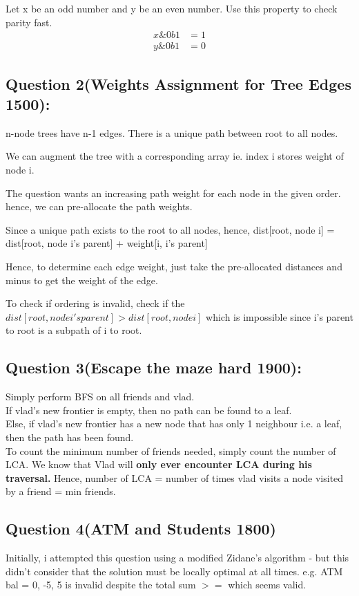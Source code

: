 \documentclass[12pt]{article}
\begin{document}
 
 Let x be an odd number and y be an even number.  Use this property to check parity fast. 
 \begin{align}
  x \& 0b1 & = 1 \\ 
  y \& 0b1 & = 0 
 \end{align} 
 
 \subsection{Question 2(Weights Assignment for Tree Edges 1500):} 
 
 n-node trees have n-1 edges. 
 There is a unique path between root to all nodes. 
 
 We can augment the tree with a corresponding array ie. index i stores weight of node i. 
 
 The question wants an increasing path weight for each node in the given order. 
 hence, we can pre-allocate the path weights. 
 
 Since a unique path exists to the root to all nodes, hence, 
 dist[root, node i] = dist[root, node i's parent] + weight[i, i's parent] 
 
 Hence, to determine each edge weight, just take the pre-allocated distances and minus to get the weight of the edge. 
 
 To check if ordering is invalid, check if the \(dist[root, node i's parent] > dist[root, node i]\) which is impossible since i's parent to root is a subpath of i to root. 
 
 \subsection{Question 3(Escape the maze hard 1900):}
 
 Simply perform BFS on all friends and vlad. \\
 If vlad's new frontier is empty, then no path can be found to a leaf. \\
 Else, if vlad's new frontier has a new node that has only 1 neighbour i.e. a leaf, then the path has been found. \\ 
 
 To count the minimum number of friends needed, simply count the number of LCA. 
 We know that Vlad will {\textbf{only ever encounter LCA during his traversal.}}
 Hence, number of LCA = number of times vlad visits a node visited by a friend = min friends.
 
 \subsection {Question 4(ATM and Students 1800)} 
 
 Initially, i attempted this question using a modified Zidane's algorithm - but this didn't consider that the solution must be locally optimal at all times. 
 e.g. ATM bal = 0, { -5, 5 } is invalid despite the total sum \(>=\) which seems valid. 
 
 
 
\end{document}
